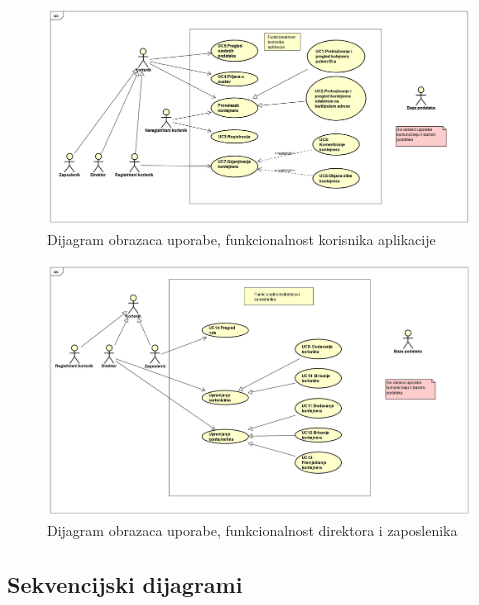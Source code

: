 			\begin{figure}
				\centering
				\includegraphics[width=1.0\linewidth]{slike/Funkcionalnost_korisnika_aplikacije.png}
				\caption{Dijagram obrazaca uporabe, funkcionalnost korisnika aplikacije}
				\label{fig:Funkcionalnost korisnika aplikacije}
			\end{figure}
			
			\clearpage
			
			\eject
			
			\begin{figure}
				\centering
				\includegraphics[width=1.0\linewidth]{slike/Funkcionalnost_direktora_i_zaposlenika.png}
				\caption{Dijagram obrazaca uporabe, funkcionalnost direktora i zaposlenika}
				\label{fig:Funkcionalnost direktora i zaposlenika}
			\end{figure}
			
			\clearpage
			
			\eject		

			\subsection{Sekvencijski dijagrami}
			
